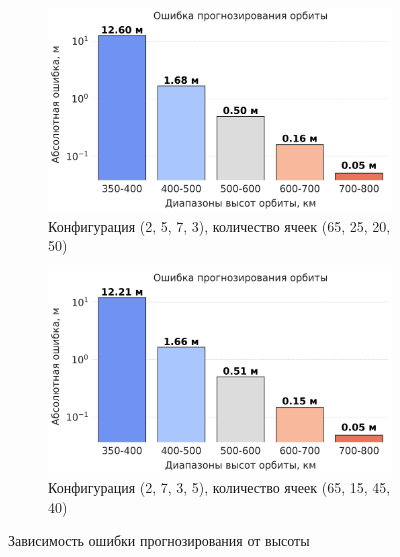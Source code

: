 \begin{figure}[htbp]
    \begin{subfigure}[b]{0.48\textwidth}
        \includegraphics[width=\linewidth]{../images/solution/atmo/propagation/2573.png}
        \caption{Конфигурация (2, 5, 7, 3),
        количество ячеек (65, 25, 20, 50)}
        \label{fig:atmo:2573_propag}
    \end{subfigure}
    \hfill
    \begin{subfigure}[b]{0.48\textwidth}
        \includegraphics[width=\linewidth]{../images/solution/atmo/propagation/2735.png}
        \caption{Конфигурация (2, 7, 3, 5),
        количество ячеек (65, 15, 45, 40)}
        \label{fig:atmo:2735_propag}
    \end{subfigure}
    \caption{Зависимость ошибки прогнозирования от высоты}
    \label{fig:all_images}
\end{figure}

\clearpage